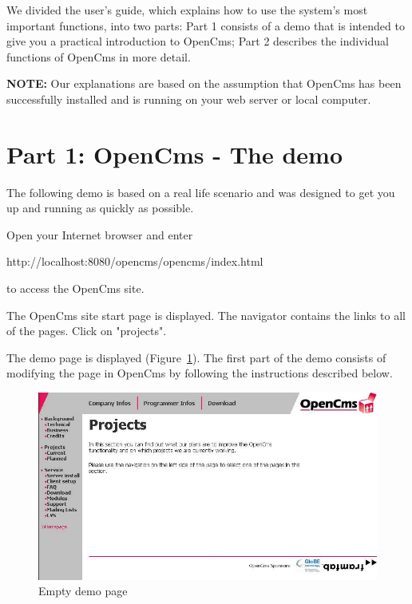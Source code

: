 We divided the user's guide, which explains how to use the system's
most important functions, into two parts: Part 1 consists of a
demo that is intended to give you a practical introduction to
OpenCms; Part 2 describes the individual functions of OpenCms in
more detail.

\textbf{NOTE:} Our explanations are based on the assumption that
OpenCms has been successfully installed and is running on your web
server or local computer.

\section{Part 1: OpenCms - The demo}

The following demo is based on a real life scenario and was
designed to get you up and running as quickly as possible.

Open your Internet browser and enter

http://localhost:8080/opencms/opencms/index.html

to access the OpenCms site.

The OpenCms site start page is displayed. The navigator contains
the links to all of the pages. Click on "projects".

The demo page is displayed (Figure~\ref{demopage01}). The first
part of the demo consists of modifying the page in OpenCms by
following the instructions described below.

\begin{figure}[hbt]
\begin{center}
\includegraphics[width=\sgw]
                   {pics/usermanual/demoPage01}
\caption[Empty demo page]
           {Empty demo page}
\label{demopage01}
\end{center}
\end{figure}

